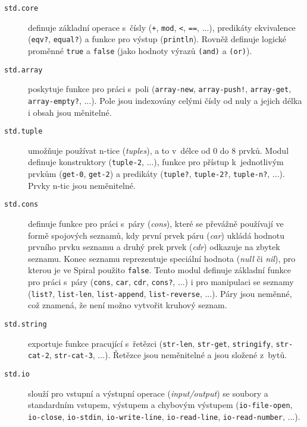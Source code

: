 \begin{description}
  \item[\texttt{std.core}] definuje základní operace s~čísly (\texttt{+},
    \texttt{mod}, \texttt{<}, \texttt{==}, ...), predikáty ekvivalence
    (\texttt{eqv?}, \texttt{equal?}) a funkce pro výstup (\texttt{println}).
    Rovněž definuje logické proměnné \texttt{true} a \texttt{false} (jako
    hodnoty výrazů \texttt{(and)} a \texttt{(or)}).

  \item[\texttt{std.array}] poskytuje funkce pro práci s~poli
    (\texttt{array-new}, \texttt{array-push!}, \texttt{array-get},
    \texttt{array-empty?}, ...). Pole jsou indexovány celými čísly od nuly a
    jejich délka i obsah jsou měnitelné.

  \item[\texttt{std.tuple}] umožňuje používat n-tice (\emph{tuples}), a to
    v~délce od 0 do 8 prvků. Modul definuje konstruktory (\texttt{tuple-2},
    ...), funkce pro přístup k~jednotlivým prvkům (\texttt{get-0},
    \texttt{get-2}) a predikáty (\texttt{tuple?}, \texttt{tuple-2?},
    \texttt{tuple-n?}, ...). Prvky n-tic jsou neměnitelné.

  \item[\texttt{std.cons}] definuje funkce pro práci s~páry (\emph{cons}), které
    se převážně používají ve formě spojových seznamů, kdy první prvek páru
    (\emph{car}) ukládá hodnotu prvního prvku seznamu a druhý prek prvek
    (\emph{cdr}) odkazuje na zbytek seznamu. Konec seznamu reprezentuje
    speciální hodnota (\emph{null} či \emph{nil}), pro kterou je ve Spiral
    použito \texttt{false}. Tento modul definuje základní funkce pro práci
    s~páry (\texttt{cons}, \texttt{car}, \texttt{cdr}, \texttt{cons?}, ...) i
    pro manipulaci se seznamy (\texttt{list?}, \texttt{list-len},
    \texttt{list-append}, \texttt{list-reverse}, ...). Páry jsou neměnné, což
    znamená, že není možno vytvořit kruhový seznam.

  \item[\texttt{std.string}] exportuje funkce pracující s~řetězci
    (\texttt{str-len}, \texttt{str-get}, \texttt{stringify}, \texttt{str-cat-2},
    \texttt{str-cat-3}, ...). Řetězce jsou neměnitelné a jsou složené z~bytů.

  \item[\texttt{std.io}] slouží pro vstupní a výstupní operace
    (\emph{input/output}) se soubory a standardním vstupem, výstupem a chybovým
    výstupem (\texttt{io-file-open}, \texttt{io-close}, \texttt{io-stdin},
    \texttt{io-write-line}, \texttt{io-read-line}, \texttt{io-read-number},
    ...).


\end{description}
